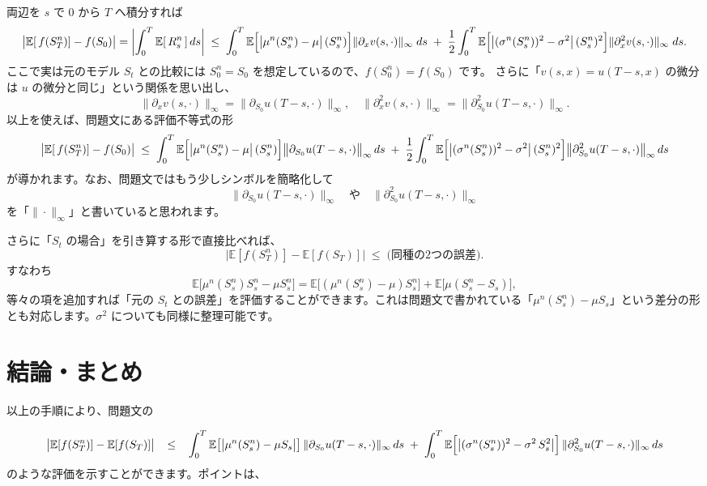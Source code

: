 \documentclass[a4paper]{jsarticle}
\begin{document}
両辺を $s$ で $0$ から $T$ へ積分すれば  
\[  
  \bigl|\mathbb{E}[\,f(S_T^n)] - f(S_0)\bigr|  
  =  
  \biggl|\int_0^T \mathbb{E}[\,R_s^n\,]\,ds\biggr|  
  \;\le\;  
  \int_0^T \mathbb{E}\Bigl[  
    \bigl|\mu^n(S_s^n) - \mu\bigr|\,(S_s^n)  
  \Bigr]  
  \|\partial_x v(s,\cdot)\|_\infty\;ds  
  \;+\;  
  \frac12  
  \int_0^T \mathbb{E}\Bigl[  
    \bigl|(\sigma^n(S_s^n))^2 - \sigma^2\bigr|\,(S_s^n)^2  
  \Bigr]  
  \|\partial_x^2 v(s,\cdot)\|_\infty\;ds.  
\]  
ここで実は元のモデル $S_t$ との比較には $S_0^n=S_0$ を想定しているので、$f(S_0^n)=f(S_0)$ です。  
さらに「$v(s,x)=u(T-s,x)$ の微分は $u$ の微分と同じ」という関係を思い出し、  
\[  
  \|\partial_x v(s,\cdot)\|_\infty  
  =  
  \|\partial_{S_0} u(T-s,\cdot)\|_\infty,  
  \quad  
  \|\partial_x^2 v(s,\cdot)\|_\infty  
  =  
  \|\partial_{S_0}^2 u(T-s,\cdot)\|_\infty.  
\]  
以上を使えば、問題文にある評価不等式の形  
\[  
  \bigl|\mathbb{E}[\,f(S_T^n)] - f(S_0)\bigr|  
  \;\le\;  
  \int_0^T  
    \mathbb{E}\Bigl[  
      \bigl|\mu^n(S_s^n) - \mu\bigr|\,(S_s^n)  
    \Bigr]  
    \bigl\|\partial_{S_0}u(T-s,\cdot)\bigr\|_\infty  
  \,ds  
  \;+\;  
  \frac12  
  \int_0^T  
    \mathbb{E}\Bigl[  
      \bigl|(\sigma^n(S_s^n))^2 - \sigma^2\bigr|\,(S_s^n)^2  
    \Bigr]  
    \bigl\|\partial_{S_0}^2 u(T-s,\cdot)\bigr\|_\infty  
  \,ds  
\]  
が導かれます。なお、問題文ではもう少しシンボルを簡略化して  
\[  
  \bigl\|\partial_{S_0}u(T-s,\cdot)\bigr\|_\infty  
  \quad\text{や}\quad  
  \bigl\|\partial_{S_0}^2 u(T-s,\cdot)\bigr\|_\infty  
\]  
を「$\|\cdot\|_{\infty}$」と書いていると思われます。  

さらに「$S_t$ の場合」を引き算する形で直接比べれば、  
\[  
  \bigl|\mathbb{E}[f(S_T^n)] - \mathbb{E}[f(S_T)]\bigr|  
  \;\le\;  
  \text{(同種の2つの誤差)}.  
\]  
すなわち  
\[  
  \mathbb{E}\bigl[\mu^n(S_s^n) S_s^n - \mu S_s^n\bigr]  
  =  
  \mathbb{E}\bigl[(\mu^n(S_s^n) - \mu) S_s^n\bigr]  
  +  
  \mathbb{E}\bigl[\mu(S_s^n - S_s)\bigr],  
\]  
等々の項を追加すれば「元の $S_t$ との誤差」を評価することができます。これは問題文で書かれている「$\mu^n(S_s^n) - \mu S_s$」という差分の形とも対応します。$\sigma^2$ についても同様に整理可能です。  

\vspace{5mm}  

\section{結論・まとめ}  

以上の手順により、問題文の  

\[  
  \bigl|\mathbb{E}[f(S_T^n)] - \mathbb{E}[f(S_T)]\bigr|  
  \;\;\;\le\;\;\;  
  \int_0^T   
    \mathbb{E}\bigl[\bigl|\mu^n(S_s^n) - \mu S_s\bigr|\bigr]  
    \,\|\partial_{S_0}u(T-s,\cdot)\|_\infty  
    \,ds  
  \;+\;  
  \int_0^T  
    \mathbb{E}\Bigl[\bigl|(\sigma^n(S_s^n))^2 - \sigma^2\,S_s^2\bigr|\Bigr]\,  
    \|\partial_{S_0}^2 u(T-s,\cdot)\|_\infty  
    \,ds  
\]  
のような評価を示すことができます。ポイントは、  
\end{document}
